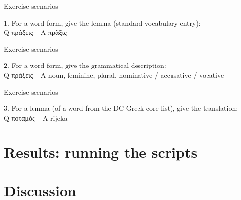 \documentclass{beamer}
\begin{document}
\begin{frame}{Exercise scenarios}

1. For a word form, give the lemma (standard vocabulary entry):\\
Q πράξεις – A πρᾶξις

\end{frame}

\begin{frame}{Exercise scenarios}


2. For a word form, give the grammatical description:\\
Q πράξεις – A noun, feminine, plural, nominative / accusative / vocative

\end{frame}

\begin{frame}{Exercise scenarios}

3. For a lemma (of a word from the DC Greek core list), give the translation:\\
Q ποταμός – A rijeka

\end{frame}

\section{Results: running the scripts}

\begin{frame}[standout]


\end{frame}

\section{Discussion}

\begin{frame}[standout]


\end{frame}



  \maketitle
\end{document}
